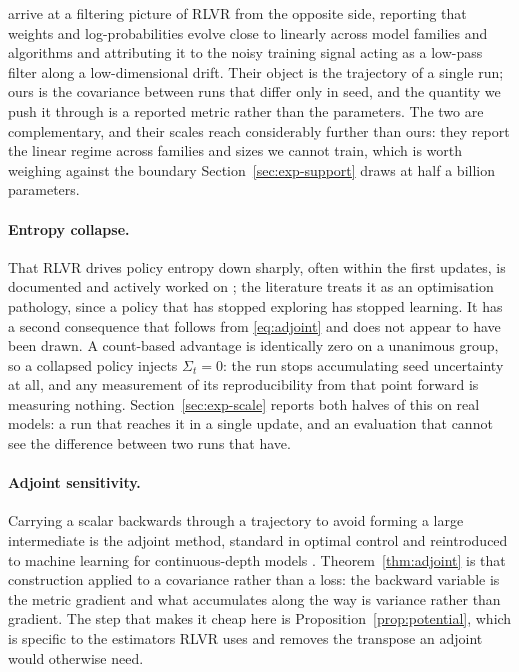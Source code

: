 \citet{wang2026linear} arrive at a filtering picture of RLVR from the opposite side, reporting that
weights and log-probabilities evolve close to linearly across model families and algorithms and
attributing it to the noisy training signal acting as a low-pass filter along a low-dimensional
drift. Their object is the trajectory of a single run; ours is the covariance between runs that
differ only in seed, and the quantity we push it through is a reported metric rather than the
parameters. The two are complementary, and their scales reach considerably further than ours: they
report the linear regime across families and sizes we cannot train, which is worth weighing against
the boundary Section~\ref{sec:exp-support} draws at half a billion parameters.

\paragraph{Entropy collapse.} That RLVR drives policy entropy down sharply, often within the first
updates, is documented and actively worked on \citep{cui2025entropy}; the literature treats it as an
optimisation pathology, since a policy that has stopped exploring has stopped learning. It has a
second consequence that follows from \eqref{eq:adjoint} and does not appear to have been drawn. A
count-based advantage is identically zero on a unanimous group, so a collapsed policy injects
$\Sigma_t = 0$: the run stops accumulating seed uncertainty at all, and any measurement of its
reproducibility from that point forward is measuring nothing. Section~\ref{sec:exp-scale} reports
both halves of this on real models: a run that reaches it in a single update, and an evaluation
that cannot see the difference between two runs that have.

\paragraph{Adjoint sensitivity.} Carrying a scalar backwards through a trajectory to avoid
forming a large intermediate is the adjoint method, standard in optimal control
\citep{pontryagin1962mathematical} and reintroduced to machine learning for continuous-depth models
\citep{chen2018neural}. Theorem~\ref{thm:adjoint} is that construction applied to a covariance
rather than a loss: the backward variable is the metric gradient and what accumulates along the way
is variance rather than gradient. The step that makes it cheap here is
Proposition~\ref{prop:potential}, which is specific to the estimators RLVR uses and removes the
transpose an adjoint would otherwise need.

